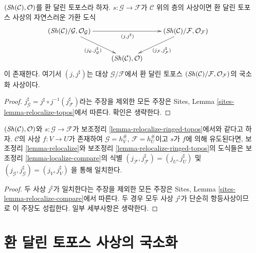 \begin{lemma}
\label{lemma-relocalize-ringed-topos}
$(\mathop{\mathit{Sh}}\nolimits(\mathcal{C}), \mathcal{O})$를 환 달린 토포스라 하자.
$s : \mathcal{G} \to \mathcal{F}$가 $\mathcal{C}$ 위의 층의 사상이면
환 달린 토포스 사상의 자연스러운 가환 도식
$$
\xymatrix{
(\Sh(\mathcal{C})/\mathcal{G}, \mathcal{O}_\mathcal{G})
\ar[rd]_{(j_\mathcal{G}, j_\mathcal{G}^\sharp)} \ar[rr]_{(j, j^\sharp)} & &
(\Sh(\mathcal{C})/\mathcal{F}, \mathcal{O}_\mathcal{F})
\ar[ld]^{(j_\mathcal{F}, j_\mathcal{F}^\sharp)} \\
& (\Sh(\mathcal{C}), \mathcal{O}) &
}
$$
이 존재한다. 여기서 $(j, j^\sharp)$는 대상 $\mathcal{G}/\mathcal{F}$에서
환 달린 토포스
$(\mathop{\mathit{Sh}}\nolimits(\mathcal{C})/\mathcal{F}, \mathcal{O}_\mathcal{F})$의 국소화 사상이다.
\end{lemma}

\begin{proof}
$j_\mathcal{G}^\sharp = j^\sharp \circ j^{-1}(j_\mathcal{F}^\sharp)$라는
주장을 제외한 모든 주장은 Sites, Lemma
\ref{sites-lemma-relocalize-topos}에서 따른다. 확인은 생략한다.
\end{proof}

\begin{lemma}
\label{lemma-relocalize-compare}
$(\mathop{\mathit{Sh}}\nolimits(\mathcal{C}), \mathcal{O})$와
$s : \mathcal{G} \to \mathcal{F}$가 보조정리
\ref{lemma-relocalize-ringed-topos}에서와 같다고 하자.
$\mathcal{C}$의 사상 $f : V \to U$가 존재하여
$\mathcal{G} = h_V^\#$, $\mathcal{F} = h_U^\#$이고 $s$가 $f$에 의해
유도된다면, 보조정리 \ref{lemma-relocalize}와 보조정리
\ref{lemma-relocalize-ringed-topos}의 도식들은 보조정리
\ref{lemma-localize-compare}의 식별
$(j_\mathcal{F}, j_\mathcal{F}^\sharp) = (j_U, j_U^\sharp)$
및
$(j_\mathcal{G}, j_\mathcal{G}^\sharp) = (j_V, j_V^\sharp)$
을 통해 일치한다.
\end{lemma}

\begin{proof}
두 사상 $j^\sharp$가 일치한다는 주장을 제외한 모든 주장은
Sites, Lemma \ref{sites-lemma-relocalize-compare}에서 따른다. 두 경우 모두
사상 $j^\sharp$가 단순히 항등사상이므로 이 주장도 성립한다.
일부 세부사항은 생략한다.
\end{proof}










\section{환 달린 토포스 사상의 국소화}
\label{section-localize-morphisms-ringed-topoi}

